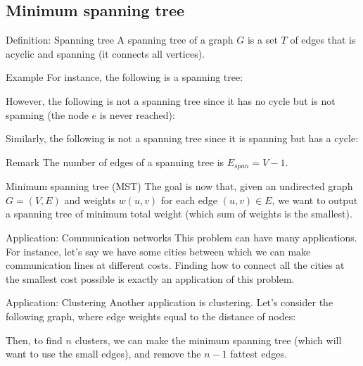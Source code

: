 \documentclass[a4paper]{article}
\begin{document}
\subsection{Minimum spanning tree}
\begin{parag}{Definition: Spanning tree}
    A spanning tree of a graph $G$ is a set $T$ of edges that is acyclic and spanning (it connects all vertices).

    \begin{subparag}{Example}
        For instance, the following is a spanning tree:

        However, the following is not a spanning tree since it has no cycle but is not spanning (the node $e$ is never reached):

        Similarly, the following is not a spanning tree since it is spanning but has a cycle:
    \end{subparag}
    
    \begin{subparag}{Remark}
        The number of edges of a spanning tree is $E_{span} = V - 1$.
    \end{subparag}
\end{parag}

\begin{parag}{Minimum spanning tree (MST)}
    The goal is now that, given an undirected graph $G = \left(V, E\right)$ and weights $w\left(u, v\right)$ for each edge $\left(u, v\right) \in E$, we want to output a spanning tree of minimum total weight (which sum of weights is the smallest).

    \begin{subparag}{Application: Communication networks}
        This problem can have many applications. For instance, let's say we have some cities between which we can make communication lines at different costs. Finding how to connect all the cities at the smallest cost possible is exactly an application of this problem.
    \end{subparag}

    \begin{subparag}{Application: Clustering}
        Another application is clustering. Let's consider the following graph, where edge weights equal to the distance of nodes:

        Then, to find $n$ clusters, we can make the minimum spanning tree (which will want to use the small edges), and remove the $n-1$ fattest edges.
    \end{subparag}
\end{parag}
\end{document}
